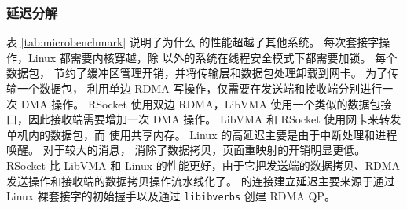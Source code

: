 \subsubsection{延迟分解}

表 \ref{tab:microbenchmark} 说明了为什么 \sys{} 的性能超越了其他系统。
每次套接字操作，Linux 都需要内核穿越，除 \sys{} 以外的系统在线程安全模式下都需要加锁。
每个数据包，\sys{} 节约了缓冲区管理开销，并将传输层和数据包处理卸载到网卡。
为了传输一个数据包，\sys{} 利用单边 RDMA 写操作，仅需要在发送端和接收端分别进行一次 DMA 操作。
RSocket 使用双边 RDMA，LibVMA 使用一个类似的数据包接口，因此接收端需要增加一次 DMA 操作。
LibVMA 和 RSocket 使用网卡来转发单机内的数据包，而 \sys{} 使用共享内存。
Linux 的高延迟主要是由于中断处理和进程唤醒。
对于较大的消息，\sys{} 消除了数据拷贝，页面重映射的开销明显更低。
RSocket 比 LibVMA 和 Linux 的性能更好，由于它把发送端的数据拷贝、RDMA 发送操作和接收端的数据拷贝操作流水线化了。
\sys{} 的连接建立延迟主要来源于通过 Linux 裸套接字的初始握手以及通过 \texttt{libibverbs} 创建 RDMA QP。

